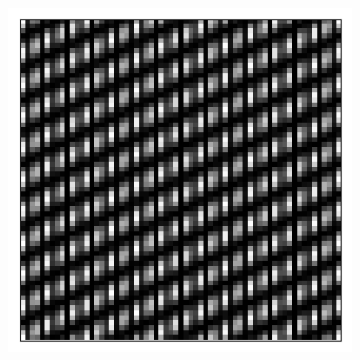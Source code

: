 \begin{figure}[h]
\begin{subfigure}[t]{0.3\textwidth}
		\caption{}
		\label{fig:fringes_2_kx_5_ky_10}
	\end{subfigure}
	\begin{subfigure}[t]{0.3\textwidth}
		\centering
		\includegraphics[width=\linewidth]{images/fringes_moire_kx_25_and_5_ky_0_and_10.png}
		\caption{}
		\label{fig:fringes_moire_kx_25_and_5_ky_0_and_10}
	\end{subfigure}


\end{figure}

